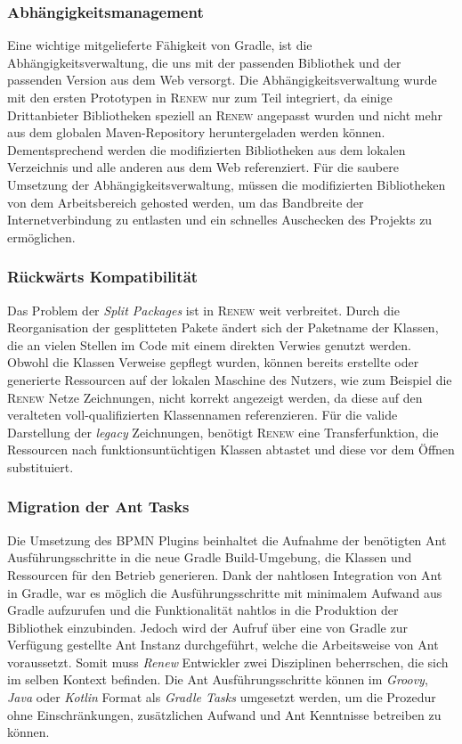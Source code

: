  \subsubsection{Abhängigkeitsmanagement}
	Eine wichtige mitgelieferte Fähigkeit von Gradle, ist die Abhängigkeitsverwaltung, die uns mit der passenden Bibliothek und der passenden Version aus dem Web versorgt. Die Abhängigkeitsverwaltung wurde mit den ersten Prototypen in \textsc{Renew} nur zum Teil integriert, da einige Drittanbieter Bibliotheken speziell an \textsc{Renew} angepasst wurden und nicht mehr aus dem globalen Maven-Repository heruntergeladen werden können. Dementsprechend werden die modifizierten Bibliotheken aus dem lokalen Verzeichnis und alle anderen aus dem Web referenziert.\newline
	Für die saubere Umsetzung der Abhängigkeitsverwaltung, müssen die modifizierten Bibliotheken von dem Arbeitsbereich gehosted werden, um das Bandbreite der Internetverbindung zu entlasten und ein schnelles Auschecken des Projekts zu ermöglichen. 	
	
 \subsubsection{Rückwärts Kompatibilität}
	Das Problem der \textit{Split Packages} ist in \textsc{Renew} weit verbreitet. Durch die Reorganisation der gesplitteten Pakete ändert sich der Paketname der Klassen, die an vielen Stellen im Code mit einem direkten Verwies genutzt werden. Obwohl die Klassen Verweise gepflegt wurden, können bereits erstellte oder generierte Ressourcen auf der lokalen Maschine des Nutzers, wie zum Beispiel die \textsc{Renew} Netze Zeichnungen, nicht korrekt angezeigt werden, da diese auf den veralteten voll-qualifizierten Klassennamen referenzieren.\newline
	Für die valide Darstellung der \textit{legacy} Zeichnungen, benötigt \textsc{Renew} eine Transferfunktion, die Ressourcen nach funktionsuntüchtigen Klassen abtastet und diese vor dem Öffnen substituiert.
	
 \subsubsection{Migration der Ant Tasks}
	Die Umsetzung des BPMN Plugins beinhaltet die Aufnahme der benötigten Ant Ausführungsschritte in die neue Gradle Build-Umgebung, die Klassen und Ressourcen für den Betrieb generieren. Dank der nahtlosen Integration von Ant in Gradle, war es möglich die Ausführungsschritte mit minimalem Aufwand aus Gradle aufzurufen und die Funktionalität nahtlos in die Produktion der Bibliothek einzubinden. Jedoch wird der Aufruf über eine von Gradle zur Verfügung gestellte Ant Instanz durchgeführt, welche die Arbeitsweise von Ant voraussetzt. Somit muss \textit{Renew} Entwickler zwei Disziplinen beherrschen, die sich im selben Kontext befinden.\newline
	Die Ant Ausführungsschritte können im \textit{Groovy}, \textit{Java} oder \textit{Kotlin} Format als \textit{Gradle Tasks} umgesetzt werden, um die Prozedur ohne Einschränkungen, zusätzlichen Aufwand und Ant Kenntnisse betreiben zu können. 
	
